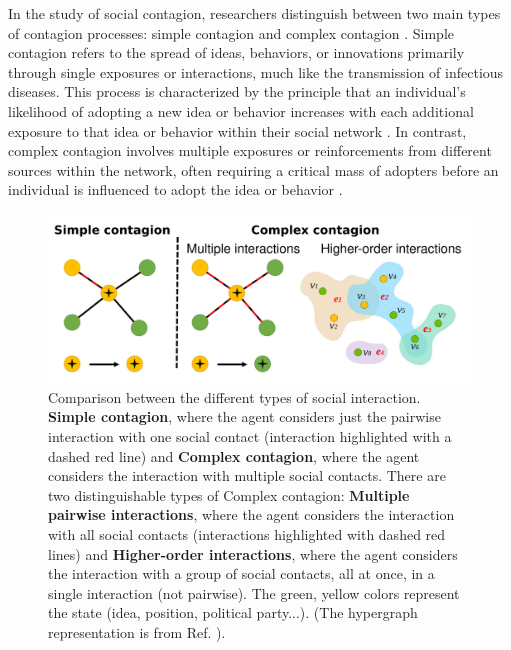 In the study of social contagion, researchers distinguish between two main types of contagion processes: simple contagion and complex contagion \cite{centola-2007}. Simple contagion refers to the spread of ideas, behaviors, or innovations primarily through single exposures or interactions, much like the transmission of infectious diseases. This process is characterized by the principle that an individual's likelihood of adopting a new idea or behavior increases with each additional exposure to that idea or behavior within their social network \cite{christakis2007spread, fowler2009cooperative}. In contrast, complex contagion involves multiple exposures or reinforcements from different sources within the network, often requiring a critical mass of adopters before an individual is influenced to adopt the idea or behavior \cite{granovetter-1978,centola-2007,centola-2010}.

\begin{figure}
    \centering
    \captionsetup{font=sf}
    \includegraphics[width=\textwidth]{Figs/Introduction/complex_simple.pdf}
    \caption[Simple and complex contagion processes]{Comparison between the different types of social interaction. {\bfseries Simple contagion}, where the agent considers just the pairwise interaction with one social contact (interaction highlighted with a dashed red line) and {\bfseries Complex contagion}, where the agent considers the interaction with multiple social contacts. There are two distinguishable types of Complex contagion: {\bfseries Multiple pairwise interactions}, where the agent considers the interaction with all social contacts (interactions highlighted with dashed red lines) and {\bfseries Higher-order interactions}, where the agent considers the interaction with a group of social contacts, all at once, in a single interaction (not pairwise). The green, yellow colors represent the state (idea, position, political party...). (The hypergraph representation is from Ref. \cite{de-arruda-2020}).}
    \label{fig:SimpleComplexContagion}
\end{figure}

